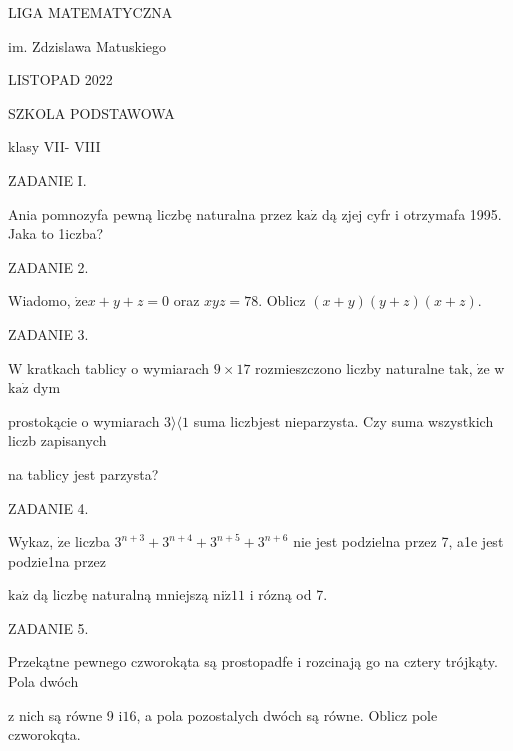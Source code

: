 \documentclass[a4paper,12pt]{article}
\begin{document}
LIGA MATEMATYCZNA

im. Zdzislawa Matuskiego

LISTOPAD 2022

SZKOLA PODSTAWOWA

klasy VII- VIII

ZADANIE I.

Ania pomnozyfa pewną liczbę naturalna przez $\mathrm{k}\mathrm{a}\dot{\mathrm{z}}$ dą zjej cyfr i otrzymafa 1995. Jaka to 1iczba?

ZADANIE 2.

Wiadomo, $\dot{\mathrm{z}}\mathrm{e}x+y+z=0$ oraz $xyz=78$. Oblicz $(x+y)(y+z)(x+z).$

ZADANIE 3.

$\mathrm{W}$ kratkach tablicy o wymiarach $9 \times 17$ rozmieszczono liczby naturalne tak, $\dot{\mathrm{z}}\mathrm{e}$ w $\mathrm{k}\mathrm{a}\dot{\mathrm{z}}$ dym

prostokącie o wymiarach $3\rangle\langle 1$ suma liczbjest nieparzysta. Czy suma wszystkich liczb zapisanych

na tablicy jest parzysta?

ZADANIE 4.

Wykaz, $\dot{\mathrm{z}}\mathrm{e}$ liczba $3^{n+3}+3^{n+4}+3^{n+5}+3^{n+6}$ nie jest podzielna przez 7, a1e jest podzie1na przez

$\mathrm{k}\mathrm{a}\dot{\mathrm{z}}$ dą liczbę naturalną mniejszą $\mathrm{n}\mathrm{i}\dot{\mathrm{z}}11$ i rózną od 7.

ZADANIE 5.

Przekątne pewnego czworokąta są prostopadfe i rozcinają go na cztery trójkąty. Pola dwóch

z nich są równe 9 $\mathrm{i}16$, a pola pozostalych dwóch są równe. Oblicz pole czworokqta.
\end{document}
